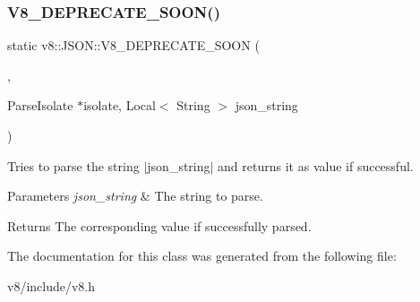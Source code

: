 \subsubsection{\texorpdfstring{V8\+\_\+\+D\+E\+P\+R\+E\+C\+A\+T\+E\+\_\+\+S\+O\+O\+N()}{V8\_DEPRECATE\_SOON()}}
{\footnotesize\ttfamily static v8\+::\+J\+S\+O\+N\+::\+V8\+\_\+\+D\+E\+P\+R\+E\+C\+A\+T\+E\+\_\+\+S\+O\+ON (\begin{DoxyParamCaption}\item[{\char`\"{}Use the maybe version taking context\char`\"{}}]{,  }\item[{\mbox{\hyperlink{classv8_1_1MaybeLocal}{Maybe\+Local}}$<$ \mbox{\hyperlink{classv8_1_1Value}{Value}} $>$ }]{ParseIsolate $\ast$isolate, Local$<$ String $>$ json\+\_\+string }\end{DoxyParamCaption})\hspace{0.3cm}{\ttfamily [static]}}

Tries to parse the string $\vert$json\+\_\+string$\vert$ and returns it as value if successful.


\begin{DoxyParams}{Parameters}
{\em json\+\_\+string} & The string to parse. \\
\hline
\end{DoxyParams}
\begin{DoxyReturn}{Returns}
The corresponding value if successfully parsed. 
\end{DoxyReturn}


The documentation for this class was generated from the following file\+:\begin{DoxyCompactItemize}
\item 
v8/include/v8.\+h\end{DoxyCompactItemize}
